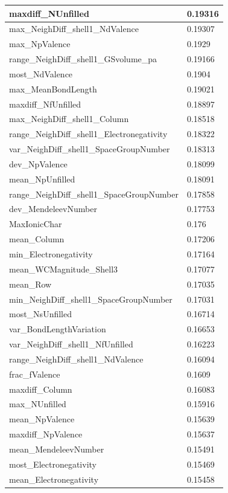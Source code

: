 \begin{longtable}{|l|l|}
maxdiff\_NUnfilled & 0.19316 \\ \hline
max\_NeighDiff\_shell1\_NdValence & 0.19307 \\ \hline
max\_NpValence & 0.1929 \\ \hline
range\_NeighDiff\_shell1\_GSvolume\_pa & 0.19166 \\ \hline
most\_NdValence & 0.1904 \\ \hline
max\_MeanBondLength & 0.19021 \\ \hline
maxdiff\_NfUnfilled & 0.18897 \\ \hline
max\_NeighDiff\_shell1\_Column & 0.18518 \\ \hline
range\_NeighDiff\_shell1\_Electronegativity & 0.18322 \\ \hline
var\_NeighDiff\_shell1\_SpaceGroupNumber & 0.18313 \\ \hline
dev\_NpValence & 0.18099 \\ \hline
mean\_NpUnfilled & 0.18091 \\ \hline
range\_NeighDiff\_shell1\_SpaceGroupNumber & 0.17858 \\ \hline
dev\_MendeleevNumber & 0.17753 \\ \hline
MaxIonicChar & 0.176 \\ \hline
mean\_Column & 0.17206 \\ \hline
min\_Electronegativity & 0.17164 \\ \hline
mean\_WCMagnitude\_Shell3 & 0.17077 \\ \hline
mean\_Row & 0.17035 \\ \hline
min\_NeighDiff\_shell1\_SpaceGroupNumber & 0.17031 \\ \hline
most\_NsUnfilled & 0.16714 \\ \hline
var\_BondLengthVariation & 0.16653 \\ \hline
var\_NeighDiff\_shell1\_NfUnfilled & 0.16223 \\ \hline
range\_NeighDiff\_shell1\_NdValence & 0.16094 \\ \hline
frac\_fValence & 0.1609 \\ \hline
maxdiff\_Column & 0.16083 \\ \hline
max\_NUnfilled & 0.15916 \\ \hline
mean\_NpValence & 0.15639 \\ \hline
maxdiff\_NpValence & 0.15637 \\ \hline
mean\_MendeleevNumber & 0.15491 \\ \hline
most\_Electronegativity & 0.15469 \\ \hline
mean\_Electronegativity & 0.15458 \\ \hline

\end{longtable}
